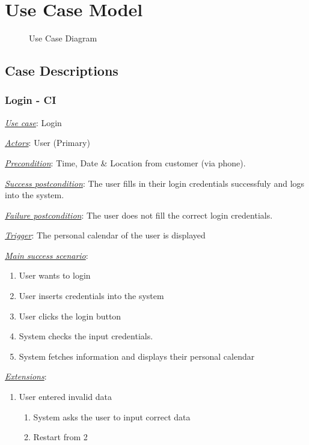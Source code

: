 \documentclass[a4paper]{article}
\begin{document}
\clearpage
\section{Use Case Model}
\begin{figure}[!ht] %
    \centering{} %
    \caption{Use Case Diagram}
    \label{fig:usecase}
\end{figure}

\subsection{Case Descriptions} %
\subsubsection{Login - CI}
\underline{\textit{Use case}}: Login

\underline{\textit{Actors}}: User (Primary)

\underline{\textit{Precondition}}: Time, Date \& Location from customer (via phone).

\underline{\textit{Success postcondition}}: The user fills in their login credentials successfuly and logs into the system.

\underline{\textit{Failure postcondition}}: The user does not fill the correct login credentials.

\underline{\textit{Trigger}}: The personal calendar of the user is displayed

\underline{\textit{Main success scenario}}: 
\begin{enumerate}[leftmargin = 3em]
    \item User wants to login
    \item User inserts credentials into the system
    \item User clicks the login button
    \item System checks the input credentials.
    \item System fetches information and displays their personal calendar
\end{enumerate} 

\underline{\textit{Extensions}}:
\begin{enumerate}[label=3\alph*, leftmargin = 3em]
    \item User entered invalid data \begin{enumerate}[label=\arabic*.]
        \item System asks the user to input correct data
        \item Restart from 2
    \end{enumerate}
\end{enumerate}
\end{document}
